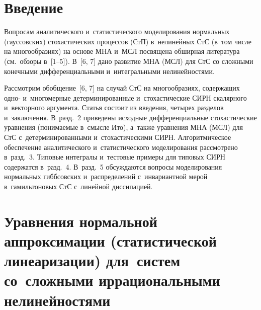 \vspace*{-6pt}




\thispagestyle{headings}

\begin{multicols}{2}

\label{st\stat}


\section{Введение}

Вопросам аналитического и~статистического моделирования нормальных (гауссовских)
стохастических процессов (СтП) в~нелинейных СтС (в~том числе на многообразиях)
на основе МНА и~МСЛ посвящена обширная литература (см.\ обзоры в~[1--5]).
В~[6, 7] дано развитие МНА (МСЛ) для СтС со сложными конечными дифференциальными
и~интегральными нелинейностями.

Рассмотрим обобщение~[6, 7] на случай СтС на многообразиях, содержащих одно-
и~многомерные детерминированные и~стохастические СИРН скалярного
и~векторного аргумента.
Статья состоит из введения, четырех разделов и~заключения. В~разд.~2
приведены исходные дифференциальные стохастические уравнения (понимаемые
в~смысле Ито), а~также уравнения МНА (МСЛ) для СтС с~детерминированными
и~стохастическими СИРН. Алгоритмическое обеспечение  аналитического
и~статистического моделирования рассмотрено в~разд.~3. Типовые интегралы
и~тестовые примеры для типовых СИРН содержатся в~разд.~4. В~разд.~5
обсуждаются вопросы моделирования нормальных гиббсо\-вских и~распределений
с~инвариантной мерой в~гамильтоновых СтС с~линейной диссипацией.

\section{Уравнения нормальной аппроксимации (статистической линеаризации)
для~систем со~сложными иррациональными нелинейностями}


\end{multicols}
